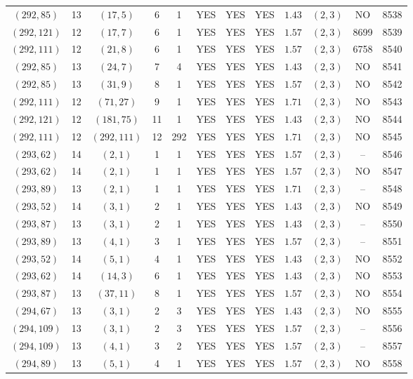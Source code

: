 \begin{longtable}{|c|c|c|c|c|c|c|c|c|c|c|c|}
$(292,85)$ & 13 & $(17,5)$ & 6 & 1 & YES & YES & YES & $1.43$ & $(2,3)$ & NO & 8538\\
$(292,121)$ & 12 & $(17,7)$ & 6 & 1 & YES & YES & YES & $1.57$ & $(2,3)$ & 8699 & 8539\\
$(292,111)$ & 12 & $(21,8)$ & 6 & 1 & YES & YES & YES & $1.57$ & $(2,3)$ & 6758 & 8540\\
$(292,85)$ & 13 & $(24,7)$ & 7 & 4 & YES & YES & YES & $1.43$ & $(2,3)$ & NO & 8541\\
$(292,85)$ & 13 & $(31,9)$ & 8 & 1 & YES & YES & YES & $1.57$ & $(2,3)$ & NO & 8542\\
$(292,111)$ & 12 & $(71,27)$ & 9 & 1 & YES & YES & YES & $1.71$ & $(2,3)$ & NO & 8543\\
$(292,121)$ & 12 & $(181,75)$ & 11 & 1 & YES & YES & YES & $1.43$ & $(2,3)$ & NO & 8544\\
$(292,111)$ & 12 & $(292,111)$ & 12 & 292 & YES & YES & YES & $1.71$ & $(2,3)$ & NO & 8545\\
$(293,62)$ & 14 & $(2,1)$ & 1 & 1 & YES & YES & YES & $1.57$ & $(2,3)$ & -- & 8546\\
$(293,62)$ & 14 & $(2,1)$ & 1 & 1 & YES & YES & YES & $1.57$ & $(2,3)$ & NO & 8547\\
$(293,89)$ & 13 & $(2,1)$ & 1 & 1 & YES & YES & YES & $1.71$ & $(2,3)$ & -- & 8548\\
$(293,52)$ & 14 & $(3,1)$ & 2 & 1 & YES & YES & YES & $1.43$ & $(2,3)$ & NO & 8549\\
$(293,87)$ & 13 & $(3,1)$ & 2 & 1 & YES & YES & YES & $1.43$ & $(2,3)$ & -- & 8550\\
$(293,89)$ & 13 & $(4,1)$ & 3 & 1 & YES & YES & YES & $1.57$ & $(2,3)$ & -- & 8551\\
$(293,52)$ & 14 & $(5,1)$ & 4 & 1 & YES & YES & YES & $1.43$ & $(2,3)$ & NO & 8552\\
$(293,62)$ & 14 & $(14,3)$ & 6 & 1 & YES & YES & YES & $1.43$ & $(2,3)$ & NO & 8553\\
$(293,87)$ & 13 & $(37,11)$ & 8 & 1 & YES & YES & YES & $1.57$ & $(2,3)$ & NO & 8554\\
$(294,67)$ & 13 & $(3,1)$ & 2 & 3 & YES & YES & YES & $1.43$ & $(2,3)$ & NO & 8555\\
$(294,109)$ & 13 & $(3,1)$ & 2 & 3 & YES & YES & YES & $1.57$ & $(2,3)$ & -- & 8556\\
$(294,109)$ & 13 & $(4,1)$ & 3 & 2 & YES & YES & YES & $1.57$ & $(2,3)$ & -- & 8557\\
$(294,89)$ & 13 & $(5,1)$ & 4 & 1 & YES & YES & YES & $1.57$ & $(2,3)$ & NO & 8558\\

\end{longtable}
